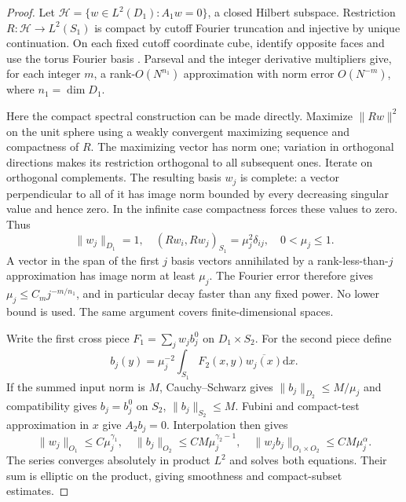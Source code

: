 \documentclass[11pt]{article}
\theoremstyle{definition}\newtheorem{definition}[theorem]{Definition}
\theoremstyle{remark}\newtheorem{remark}[theorem]{Remark}
\newcommand{\dd}{\mathrm d}
\newcommand{\norm}[1]{\lVert #1\rVert}
\begin{document}
\begin{proof}
Let $\mathcal H=\{w\in L^2(D_1):A_1w=0\}$, a closed Hilbert subspace.
Restriction $R:\mathcal H\to L^2(S_1)$ is compact by cutoff Fourier
truncation and injective by unique continuation. On each fixed cutoff
coordinate cube, identify opposite faces and use the torus Fourier basis
\cite[Section 2, Theorem 21 and Corollary 22]{TaoFourier}.
Parseval and the integer derivative multipliers give, for each integer $m$,
a rank-$O(N^{n_1})$ approximation with norm error $O(N^{-m})$,
where $n_1=\dim D_1$.

Here the compact spectral construction can be made directly. Maximize
$\norm{Rw}^2$ on the unit sphere using a weakly convergent maximizing
sequence and compactness of $R$. The maximizing vector has norm one;
variation in orthogonal directions makes its restriction orthogonal to
all subsequent ones. Iterate on orthogonal complements. The resulting
basis $w_j$ is complete: a vector perpendicular to all of it has image
norm bounded by every decreasing singular value and hence zero.
In the infinite case compactness forces these values to zero.
Thus
\[
 \norm{w_j}_{D_1}=1,\quad (Rw_i,Rw_j)_{S_1}=\mu_j^2\delta_{ij},\quad
 0<\mu_j\le1.
\]
A vector in the span of the first $j$ basis vectors annihilated by a
rank-less-than-$j$ approximation has image norm at least $\mu_j$.
The Fourier error therefore gives $\mu_j\le C_mj^{-m/n_1}$, and in
particular decay faster than any fixed power. No lower bound is used.
The same argument covers finite-dimensional spaces.

Write the first cross piece $F_1=\sum_jw_jb_j^0$ on $D_1\times S_2$.
For the second piece define
\[
 b_j(y)=\mu_j^{-2}\int_{S_1}F_2(x,y)\overline{w_j(x)}\dd x.
\]
If the summed input norm is $M$, Cauchy--Schwarz gives
$\norm{b_j}_{D_2}\le M/\mu_j$ and compatibility gives
$b_j=b_j^0$ on $S_2$, $\norm{b_j}_{S_2}\le M$.
Fubini and compact-test approximation in $x$ give $A_2b_j=0$.
Interpolation then gives
\[
 \norm{w_j}_{O_1}\le C\mu_j^{\gamma_1},\quad
 \norm{b_j}_{O_2}\le CM\mu_j^{\gamma_2-1},\quad
 \norm{w_jb_j}_{O_1\times O_2}\le CM\mu_j^\alpha.
\]
The series converges absolutely in product $L^2$ and solves both equations.
Their sum is elliptic on the product, giving smoothness and compact-subset
estimates.


\end{proof}
\end{document}
